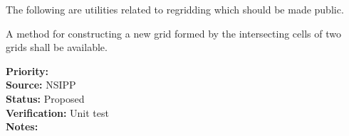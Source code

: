 
The following are utilities related to regridding which should be made
public.


A method for constructing a new grid formed by the intersecting
cells of two grids shall be available.

\begin{reqlist}
{\bf Priority:}  \\
{\bf Source:}  NSIPP \\
{\bf Status:} Proposed \\
{\bf Verification:} Unit test \\
{\bf Notes:} 
\end{reqlist}


